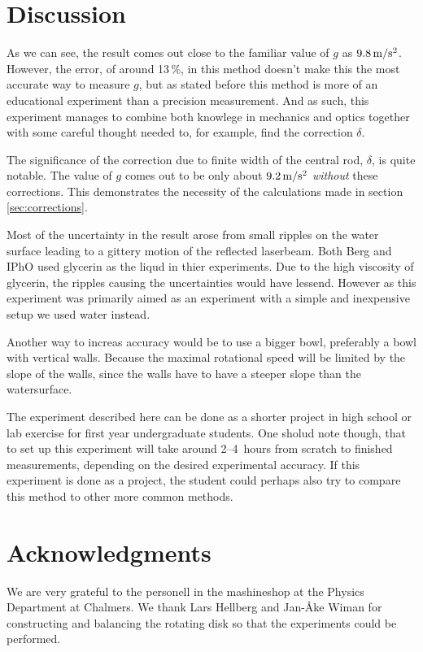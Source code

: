 \documentclass[11pt,towcolumn, swedish, english]{article}
\begin{document}
\section{Discussion}
As we can see, the result comes out close to the familiar value of $g$
as $\unit[9.8]{m/s^2}$. However, the error, of around 13\,\%, in this
method doesn't make this the most accurate way to measure $g$, but as
stated before this method is more of an educational experiment than a
precision measurement. And as such, this experiment manages to combine
both knowlege in mechanics and optics together with some careful
thought needed to, for example, find the correction $\delta$.

The significance of the correction due to finite width of the central
rod, $\delta$, is quite notable. The value of $g$ comes out to be only
about $\unit[9.2]{m/s^2}$ \emph{without} these corrections. This
demonstrates the necessity of the calculations made in section
\ref{sec:corrections}. 

Most of the uncertainty in the result arose from small ripples on the
water surface leading to a gittery motion of the reflected
laserbeam. Both Berg\cite{Berg1990} and IPhO\cite{IPhO2001} used
glycerin as the liqud in thier experiments. Due to the high viscosity
of glycerin, the ripples causing the uncertainties would have lessend.
However as this experiment was primarily aimed as an experiment with a
simple and inexpensive setup we used water instead.  

Another way to increas accuracy would be to use a bigger bowl,
preferably a bowl with vertical walls. Because the maximal rotational
speed will be limited by the slope of the walls, since the walls have
to have a steeper slope than the watersurface.

The experiment described here can be done as a shorter project in high
school or lab exercise for first year undergraduate students. One
sholud note though, that to set up this experiment will take around
2--4~hours from scratch to finished measurements, depending on the
desired experimental accuracy. If this experiment is done as a
project, the student could perhaps also try to compare this method to
other more common methods.


\section*{Acknowledgments}
We are very grateful to the personell in the mashineshop at the
Physics Department at Chalmers. We thank Lars Hellberg and Jan-Åke
Wiman for constructing and balancing the rotating disk so that the
experiments could be performed. 





\end{document}
